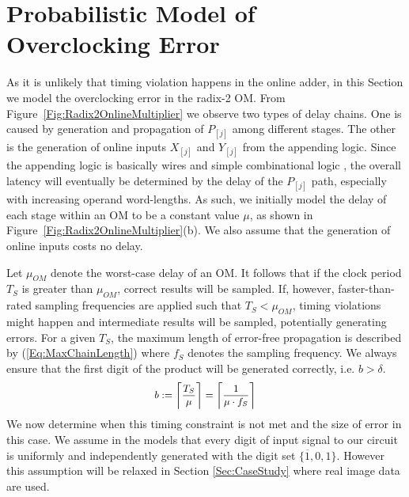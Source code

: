 \documentclass{acm_proc_article-sp}
\begin{document}
\section{Probabilistic Model of\\Overclocking Error}
As it is unlikely that timing violation happens in the online adder, in this Section we model the overclocking error in the radix-2 OM. From Figure~\ref{Fig:Radix2OnlineMultiplier} we observe two types of delay chains. One is caused by generation and propagation of $P_{[j]}$ among different stages. The other is the generation of online inputs $X_{[j]}$ and $Y_{[j]}$ from the appending logic. Since the appending logic is basically wires and simple combinational logic \cite{Online_Conversion}, the overall latency will eventually be determined by the delay of the $P_{[j]}$ path, especially with increasing operand word-lengths. As such, we initially model the delay of each stage within an OM to be a constant value $\mu$, as shown in Figure~\ref{Fig:Radix2OnlineMultiplier}(b). We also assume that the generation of online inputs costs no delay.\vspace{-1ex}

Let $\mu_{OM}$ denote the worst-case delay of an OM. It follows that if the clock period $T_S$ is greater than $\mu_{OM}$, correct results will be sampled. If, however, faster-than-rated sampling frequencies are applied such that $T_S<\mu_{OM}$, timing violations might happen and intermediate results will be sampled, potentially generating errors. For a given $T_S$, the maximum length of error-free propagation is described by (\ref{Eq:MaxChainLength}) where $f_S$ denotes the sampling frequency. We always ensure that the first digit of the product will be generated correctly, i.e. $b>\delta$.
%
\begin{eqnarray}\label{Eq:MaxChainLength}
\footnotesize
  b:=\left\lceil \frac{T_S}{\mu} \right\rceil=\left\lceil \frac{1}{\mu\cdot f_S}\right\rceil
\normalsize
\end{eqnarray}
%
We now determine when this timing constraint is not met and the size of error in this case. We assume in the models that every digit of input signal to our circuit is uniformly and independently generated with the digit set $\{\overline{1},0,1\}$. However this assumption will be relaxed in Section \ref{Sec:CaseStudy} where real image data are used.
\end{document}
